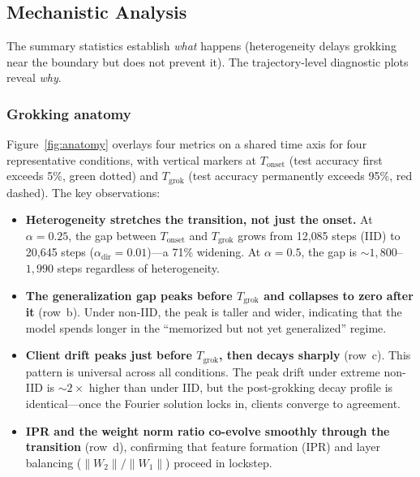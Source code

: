 \subsection{Mechanistic Analysis}
\label{sec:exp3-mech}

The summary statistics establish \emph{what} happens (heterogeneity delays
grokking near the boundary but does not prevent it).  The trajectory-level
diagnostic plots reveal \emph{why}.

\subsubsection{Grokking anatomy}

Figure~\ref{fig:anatomy} overlays four metrics on a shared time axis for four
representative conditions, with vertical markers at $T_{\mathrm{onset}}$
(test accuracy first exceeds 5\%, green dotted) and $T_{\mathrm{grok}}$
(test accuracy permanently exceeds 95\%, red dashed).  The key observations:

\begin{itemize}
  \item \textbf{Heterogeneity stretches the transition, not just the onset.}
        At $\alpha{=}0.25$, the gap between $T_{\mathrm{onset}}$ and
        $T_{\mathrm{grok}}$ grows from 12{,}085 steps (IID) to 20{,}645 steps
        ($\alpha_{\mathrm{dir}}{=}0.01$)---a 71\% widening.  At $\alpha{=}0.5$,
        the gap is ${\sim}1{,}800$--$1{,}990$ steps regardless of heterogeneity.

  \item \textbf{The generalization gap peaks before $T_{\mathrm{grok}}$ and
        collapses to zero after it} (row~b).  Under non-IID, the peak is
        taller and wider, indicating that the model spends longer in the
        ``memorized but not yet generalized'' regime.

  \item \textbf{Client drift peaks just before $T_{\mathrm{grok}}$, then
        decays sharply} (row~c).  This pattern is universal across all
        conditions.  The peak drift under extreme non-IID is ${\sim}2\times$
        higher than under IID, but the post-grokking decay profile is
        identical---once the Fourier solution locks in, clients converge to
        agreement.

  \item \textbf{IPR and the weight norm ratio co-evolve smoothly through the
        transition} (row~d), confirming that feature formation (IPR) and
        layer balancing ($\|W_2\|/\|W_1\|$) proceed in lockstep.
\end{itemize}

